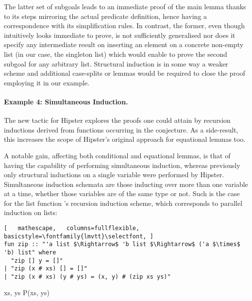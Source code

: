 The latter set of subgoals leads to an immediate proof of the main lemma thanks to its steps mirroring the actual predicate definition, hence having a correspondence with its simplification rules.
%
In contrast, the former, even though intuitively looks immediate to prove, is not sufficiently generalised nor does it specify any intermediate result on inserting an element on a concrete non-empty list (in our case, the singleton list) which would enable to prove the second subgoal for any arbitrary list. Structural induction is in some way a weaker scheme and additional case-splits or lemmas would be required to close the proof employing it in our example.

\paragraph*{Example 4: Simultaneous Induction.}
The new tactic for Hipster explores the proofs one could attain by recursion inductions derived from functions occurring in the conjecture.
%
As a side-result, this increases the scope of Hipster's original approach for equational lemmas too.

A notable gain, affecting both conditional and equational lemmas, is that of having the capability of performing simultaneous induction, whereas previously only structural inductions on a single variable were performed by Hipster.
%
Simultaneous induction schemata are those inducting over more than one variable at a time, whether those variables are of the same type or not.
%
Such is the case for the list function 's recursion induction scheme, which corresponds to parallel induction on lists:

\begin{lstlisting}[   mathescape,   columns=fullflexible,   basicstyle=\fontfamily{lmvtt}\selectfont, ]
fun zip :: "'a list $\Rightarrow$ 'b list $\Rightarrow$ ('a $\times$ 'b) list" where
  "zip [] y = []"
| "zip (x # xs) [] = []"
| "zip (x # xs) (y # ys) = (x, y) # (zip xs ys)"
\end{lstlisting}

\vspace{2 mm}

  {\forall xs, \; ys \;\; P\;(xs,\; ys)}


